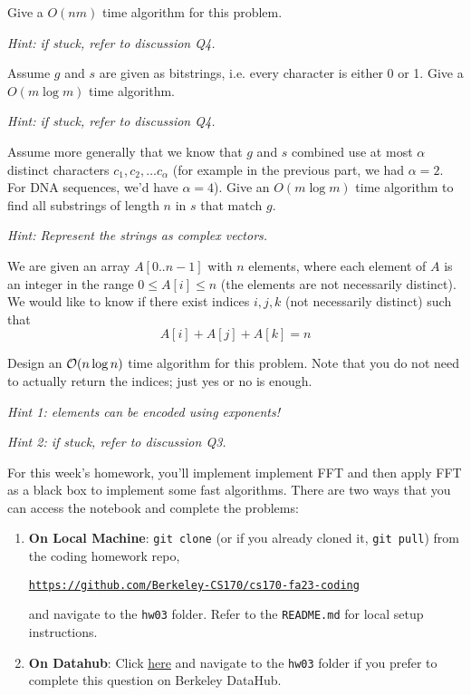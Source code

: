\documentclass[11pt]{article}
\begin{document}
\begin{subparts}
\subpart Give a $O(nm)$ time algorithm for this problem.

\emph{Hint: if stuck, refer to discussion Q4.}

\subpart Assume $g$ and $s$ are given as bitstrings, i.e. every character is either 0 or 1. Give a $O(m\log m)$ time algorithm. 

\emph{Hint: if stuck, refer to discussion Q4.}

\subpart Assume more generally that we know that $g$ and $s$ combined use at most $\alpha$ distinct characters $c_1, c_2, \ldots c_\alpha$ 
(for example in the previous part, we had $\alpha = 2$. For DNA sequences, we'd have $\alpha = 4$). Give an $O(m \log m)$ time algorithm to find all substrings of length $n$ in $s$ that match $g$.

\emph{Hint: Represent the strings as complex vectors.}

\end{subparts}

We are given an array $A[0..n-1]$ with $n$ elements, where each
element of $A$ is an integer in the range $0 \le A[i] \le n$ (the elements are not necessarily distinct).
We would like to know if there exist indices $i,j,k$ (not necessarily distinct) such that
$$A[i]+A[j]+A[k]=n$$

\noindent Design an $\mathcal{O}(n \log n)$ time algorithm for this problem. Note that you
do not need to actually return the indices; just yes or no is enough. 

\emph{Hint 1: elements can be encoded using exponents!}

\emph{Hint 2: if stuck, refer to discussion Q3.}


For this week's homework, you'll implement implement FFT and then apply FFT as a black box to implement some fast algorithms. There are two ways that you can access the notebook and complete the problems:
\begin{enumerate}
    \item \textbf{On Local Machine}: \texttt{git clone} (or if you already cloned it, \texttt{git pull}) from the coding homework repo, 
    
    \href{https://github.com/Berkeley-CS170/cs170-fa23-coding}{\texttt{https://github.com/Berkeley-CS170/cs170-fa23-coding}}
    
    and navigate to the \texttt{hw03} folder. Refer to the \texttt{README.md} for local setup instructions.

    \item \textbf{On Datahub}: Click \href{https://datahub.berkeley.edu/hub/user-redirect/git-pull?repo=https%3A%2F%2Fgithub.com%2FBerkeley-CS170%2Fcs170-fa23-coding&urlpath=tree%2Fcs170-fa23-coding%2Fhw03%2Ffft.ipynb&branch=main}{here} and navigate to the \texttt{hw03} folder if you prefer to complete this question on Berkeley DataHub.
\end{enumerate}
\end{document}
